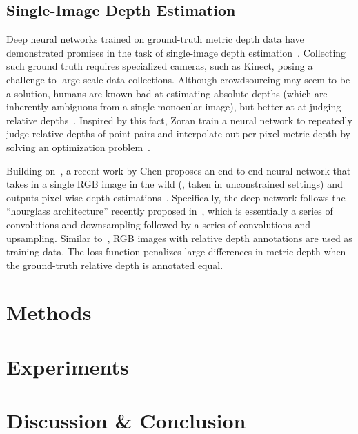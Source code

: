 \documentclass[10pt,twocolumn,letterpaper]{article}
\begin{document}
\subsection{Single-Image Depth Estimation}

Deep neural networks trained on ground-truth metric depth data have demonstrated promises in the task of single-image depth estimation~\cite{liu2015deep,eigen2015predicting,li2015depth,wang2015towards}. Collecting such ground truth requires specialized cameras, such as Kinect, posing a challenge to large-scale data collections. Although crowdsourcing may seem to be a solution, humans are known bad at estimating absolute depths (which are inherently ambiguous from a single monocular image), but better at at judging relative depths~\cite{todd2003visual}. Inspired by this fact, Zoran \etal train a neural network to repeatedly judge relative depths of point pairs and interpolate out per-pixel metric depth by solving an optimization problem~\cite{zoran2015learning}.

Building on~\cite{zoran2015learning}, a recent work by Chen \etal proposes an end-to-end neural network that takes in a single RGB image in the wild (\ie, taken in unconstrained settings) and outputs pixel-wise depth estimations~\cite{chen2016single}. Specifically, the deep network follows the ``hourglass architecture'' recently proposed in~\cite{newell2016stacked}, which is essentially a series of convolutions and downsampling followed by a series of convolutions and upsampling. Similar to~\cite{zoran2015learning}, RGB images with relative depth annotations are used as training data. The loss function penalizes large differences in metric depth when the ground-truth relative depth is annotated equal.

\section{Methods}

\section{Experiments}

\section{Discussion \& Conclusion}



{\small


}
\end{document}
